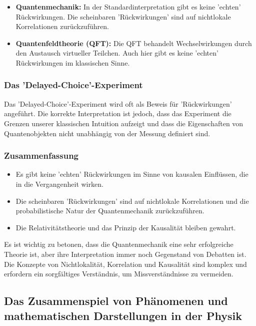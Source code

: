 \documentclass{article}
\begin{document}
	\begin{itemize}
		\item \textbf{Quantenmechanik:} In der Standardinterpretation gibt es keine 'echten' Rückwirkungen. Die scheinbaren 'Rückwirkungen' sind auf nichtlokale Korrelationen zurückzuführen.
		\item \textbf{Quantenfeldtheorie (QFT):} Die QFT behandelt Wechselwirkungen durch den Austausch virtueller Teilchen. Auch hier gibt es keine 'echten' Rückwirkungen im klassischen Sinne.
	\end{itemize}
	
	\subsubsection{Das 'Delayed-Choice'-Experiment}
	
	Das 'Delayed-Choice'-Experiment wird oft als Beweis für 'Rückwirkungen' angeführt. Die korrekte Interpretation ist jedoch, dass das Experiment die Grenzen unserer klassischen Intuition aufzeigt und dass die Eigenschaften von Quantenobjekten nicht unabhängig von der Messung definiert sind.
	
	\subsubsection{Zusammenfassung}
	
	\begin{itemize}
		\item Es gibt keine 'echten' Rückwirkungen im Sinne von kausalen Einflüssen, die in die Vergangenheit wirken.
		\item Die scheinbaren 'Rückwirkungen' sind auf nichtlokale Korrelationen und die probabilistische Natur der Quantenmechanik zurückzuführen.
		\item Die Relativitätstheorie und das Prinzip der Kausalität bleiben gewahrt.
	\end{itemize}
	
	Es ist wichtig zu betonen, dass die Quantenmechanik eine sehr erfolgreiche Theorie ist, aber ihre Interpretation immer noch Gegenstand von Debatten ist. Die Konzepte von Nichtlokalität, Korrelation und Kausalität sind komplex und erfordern ein sorgfältiges Verständnis, um Missverständnisse zu vermeiden.
		
\subsection{Das Zusammenspiel von Phänomenen und mathematischen Darstellungen in der Physik}
\end{document}
